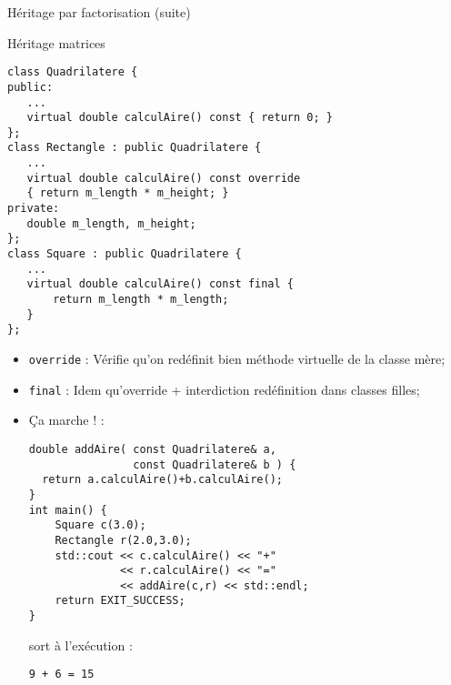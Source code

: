 \documentclass[handout,10pt]{beamer}
\begin{document}
\begin{frame}[fragile]{Héritage par factorisation (suite)}
\tiny
\begin{exampleblock}{Héritage matrices}
\begin{minipage}{0.48\textwidth}
\begin{lstlisting}
class Quadrilatere {
public:
   ...
   virtual double calculAire() const { return 0; }
};
class Rectangle : public Quadrilatere {
   ...
   virtual double calculAire() const override
   { return m_length * m_height; }
private:
   double m_length, m_height;
};
class Square : public Quadrilatere {
   ...
   virtual double calculAire() const final {
       return m_length * m_length;
   }
};\end{lstlisting}
\end{minipage}\hfill
\begin{minipage}{0.48\textwidth}
\begin{itemize}
\item \alert{\texttt{override}} : Vérifie qu'on redéfinit bien méthode virtuelle de la classe mère;
\item \alert{\texttt{final}} : Idem qu'override + interdiction redéfinition dans classes filles;
\item Ça marche ! :
\begin{lstlisting}
double addAire( const Quadrilatere& a, 
                const Quadrilatere& b ) {
  return a.calculAire()+b.calculAire();
}
int main() {
    Square c(3.0);
    Rectangle r(2.0,3.0);
    std::cout << c.calculAire() << "+" 
              << r.calculAire() << "="
              << addAire(c,r) << std::endl;
    return EXIT_SUCCESS;
}
\end{lstlisting}
sort à l'exécution :
\begin{lstlisting}
9 + 6 = 15
\end{lstlisting}
\end{itemize}
\end{minipage}
\end{exampleblock}
\end{frame}
\end{document}
